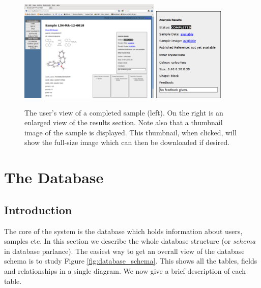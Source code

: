 \documentclass[12pt]{article}
\begin{document}
\begin{enumerate}[(i)]
\begin{figure}[!h]
\begin{center}
\includegraphics[width=0.60\textwidth]{sampleshowpage}
\quad
\includegraphics[width=0.30\textwidth]{sampleresults}
\caption{The user's view of a completed sample (left). On the right is
an enlarged view of the results section. Note also that a thumbnail image
of the sample is displayed. This thumbnail, when clicked, will show the
full-size image which can then be downloaded if desired.\label{fig:sampleshowpage}}
\end{center}
\end{figure}


\end{enumerate}


\section{The Database}\label{sec:database}
\subsection{Introduction}
The core of the system is the database which holds information about 
users, samples etc. In this section we describe the whole database
structure (or \emph{schema} in database parlance).
The easiest way to get an overall view of the database schema is to
study Figure \ref{fig:database_schema}. This shows
all the tables, fields and relationships in a single diagram.
We now give a brief description of each table.
\end{document}
